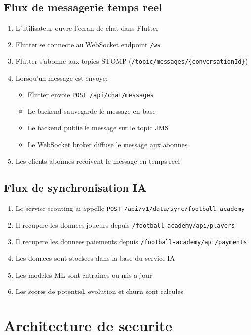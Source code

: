 \subsection*{Flux de messagerie temps reel}

\begin{enumerate}[leftmargin=*]
  \item L'utilisateur ouvre l'ecran de chat dans Flutter
  \item Flutter se connecte au WebSocket endpoint \texttt{/ws}
  \item Flutter s'abonne aux topics STOMP (\texttt{/topic/messages/\{conversationId\}})
  \item Lorsqu'un message est envoye:
    \begin{itemize}[leftmargin=*]
      \item Flutter envoie \texttt{POST /api/chat/messages}
      \item Le backend sauvegarde le message en base
      \item Le backend publie le message sur le topic JMS
      \item Le WebSocket broker diffuse le message aux abonnes
    \end{itemize}
  \item Les clients abonnes recoivent le message en temps reel
\end{enumerate}

\subsection*{Flux de synchronisation IA}

\begin{enumerate}[leftmargin=*]
  \item Le service scouting-ai appelle \texttt{POST /api/v1/data/sync/football-academy}
  \item Il recupere les donnees joueurs depuis \texttt{/football-academy/api/players}
  \item Il recupere les donnees paiements depuis \texttt{/football-academy/api/payments}
  \item Les donnees sont stockees dans la base du service IA
  \item Les modeles ML sont entraines ou mis a jour
  \item Les scores de potentiel, evolution et churn sont calcules
\end{enumerate}

\section{Architecture de securite}

